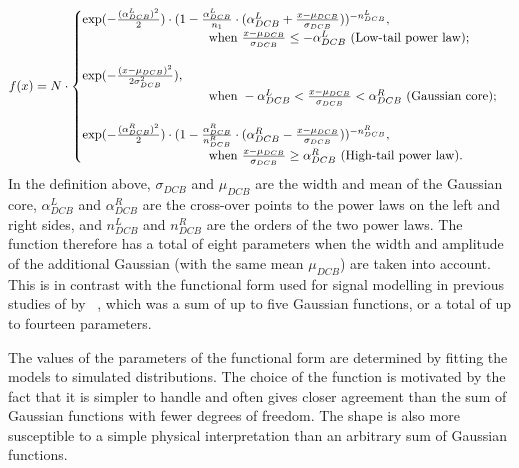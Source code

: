 \begin{equation}
\label{eq:DCB_form}
f(x)= N \cdot \begin{cases} 
\exp(-\frac{(\alpha_{DCB}^{L})^2}{2}) \cdot (1-\frac{\alpha_{DCB}^{L}}{n_1}\cdot (\alpha_{DCB}^{L} +\frac{x-\mu_{DCB}}{\sigma_{DCB}}))^{-n_{DCB}^{L}}, \\
\hspace{3.5cm} \text{when } \frac{x-\mu_{DCB}}{\sigma_{DCB}} \leq -\alpha_{DCB}^{L} \text{ (Low-tail power law)}; \\ 
\\
\exp (-\frac{(x-\mu_{DCB})^{2}}{2\sigma_{DCB}^2}), \\
 \hspace{3.5cm} \text{when } -\alpha_{DCB}^{L} < \frac{x-\mu_{DCB}}{\sigma_{DCB}} < \alpha_{DCB}^{R} \text{ (Gaussian core)}; \\ 
 \\
\exp(-\frac{(\alpha_{DCB}^{R})^2}{2}) \cdot (1-\frac{\alpha_{DCB}^{R}}{n_{DCB}^{R}}\cdot (\alpha_{DCB}^{R} - \frac{x-\mu_{DCB}}{\sigma_{DCB}}))^{-n_{DCB}^{R}},\\
 \hspace{3.5cm} \text{when } \frac{x-\mu_{DCB}}{\sigma_{DCB}} \geq \alpha_{DCB}^{R} \text{ (High-tail power law)}. \\
\end{cases}
\end{equation}
In the definition above, $\sigma_{DCB}$ and $\mu_{DCB}$ are the width and mean of the Gaussian core, $\alpha_{DCB}^{L}$ and $\alpha_{DCB}^{R}$ are the cross-over points to the power laws on the left and right sides, and $n_{DCB}^{L}$ and $n_{DCB}^{R}$ are the orders of the two power laws. The \DCBpG function therefore has a total of eight parameters when the width and amplitude of the additional Gaussian (with the same mean $\mu_{DCB}$) are taken into account. This is in contrast with the functional form used for signal modelling in previous studies of \Hgg by \CMS~\cite{LegacyHgg,CMS-PAS-HIG-15-005,CMS-PAS-HIG-16-020}, which was a sum of up to five Gaussian functions, or a total of up to fourteen parameters.

The values of the parameters of the functional form are determined by fitting the models to simulated \mgg distributions. 
The choice of the \DCBpG function is motivated by the fact that it is simpler to handle and often gives closer agreement than the sum of Gaussian functions with fewer degrees of freedom. 
The \DCB shape is also more susceptible to a simple physical interpretation than an arbitrary sum of Gaussian functions. 

